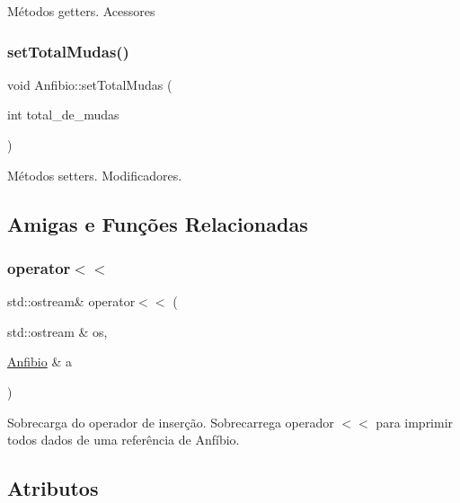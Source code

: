 Métodos getters. Acessores \mbox{\label{classAnfibio_a61a9e310e2447380940413bc3ff53c19}} 
\subsubsection{\texorpdfstring{set\+Total\+Mudas()}{setTotalMudas()}}
{\footnotesize\ttfamily void Anfibio\+::set\+Total\+Mudas (\begin{DoxyParamCaption}\item[{int}]{total\+\_\+de\+\_\+mudas }\end{DoxyParamCaption})}

Métodos setters. Modificadores. 

\subsection{Amigas e Funções Relacionadas}
\mbox{\label{classAnfibio_a0c4cab2951e6110fd77ba060a8defb7c}} 
\subsubsection{\texorpdfstring{operator$<$$<$}{operator<<}}
{\footnotesize\ttfamily std\+::ostream\& operator$<$$<$ (\begin{DoxyParamCaption}\item[{std\+::ostream \&}]{os,  }\item[{\hyperlink{classAnfibio}{Anfibio} \&}]{a }\end{DoxyParamCaption})\hspace{0.3cm}{\ttfamily [friend]}}

Sobrecarga do operador de inserção. Sobrecarrega operador $<$$<$ para imprimir todos dados de uma referência de Anfíbio. 

\subsection{Atributos}
\mbox{\label{classAnfibio_a994200134b0d314e3db0ac5c781bb7e7}} 
